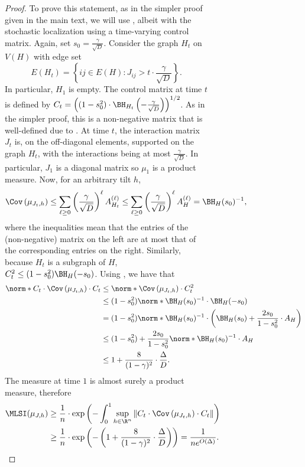 \documentclass[11pt,letterpaper]{article}
\begin{document}
\begin{figure}
\begin{figure}
\begin{proof}
    To prove this statement, as in the simpler proof given in the main text, we will use , albeit with the stochastic localization using a time-varying control matrix. Again, set $s_0 = \frac{\gamma}{\sqrt{D}}$. Consider the graph $H_t$ on $V(H)$ with edge set
    \[ E(H_t) = \left\{ ij \in E(H) : J_{ij} > t \cdot  \frac{\gamma}{\sqrt{D}} \right\}. \]
    In particular, $H_1$ is empty.
    The control matrix at time $t$ is defined by $C_t = \left((1-s_0^2) \cdot \BH_{H_t} \left( - \frac{\gamma}{\sqrt{D}} \right)\right)^{1/2}$. As in the simpler proof, this is a non-negative matrix that is well-defined due to . At time $t$, the interaction matrix $J_t$ is, on the off-diagonal elements, supported on the graph $H_t$, with the interactions being at most $\frac{\gamma}{\sqrt{D}}$. In particular, $J_1$ is a diagonal matrix so $\mu_{1}$ is a product measure. Now, for an arbitrary tilt $h$,
    \[ \Cov\left( \mu_{J_t,h} \right) \le \sum_{\ell \ge 0} \left( \frac{\gamma}{\sqrt{D}} \right)^{\ell} A^{(\ell)}_{H_t} \le \sum_{\ell \ge 0} \left( \frac{\gamma}{\sqrt{D}} \right)^{\ell} A^{(\ell)}_{H} = \BH_{H}(s_0)^{-1}, \]
    where the inequalities mean that the entries of the (non-negative) matrix on the left are at most that of the corresponding entries on the right. Similarly, because $H_t$ is a subgraph of $H$, $C_t^2 \le (1-s_0^2) \BH_H(-s_0)$. Using , we have that
    \begin{align*}
        \norm*{ C_t \cdot \Cov\left( \mu_{J_t,h} \right) \cdot C_t } &\le \norm*{ \Cov\left( \mu_{J_t,h} \right) \cdot C_t^2 } \\
            &\le (1-s_0^2) \norm*{ \BH_{H}(s_0)^{-1} \cdot \BH_{H}(-s_0) } \\
            &= (1-s_0^2) \norm*{ \BH_{H}(s_0)^{-1} \cdot \left(\BH_{H}(s_0) + \frac{2s_0}{1-s_0^2} \cdot A_{H} \right) } \\
            &\le (1-s_0^2) + \frac{2s_0}{1-s_0^2} \norm*{ \BH_{H}(s_0)^{-1} \cdot A_{H} } \\
            &\le 1 + \frac{8}{(1-\gamma)^2} \cdot \frac{\Delta}{D}.
    \end{align*}
    The measure at time $1$ is almost surely a product measure, therefore
    \begin{align*}
        \MLSI(\mu_{J,h}) &\ge \frac{1}{n} \cdot \exp \left( - \int_0^1 \sup_{h \in \R^n} \left\| C_t \cdot \Cov\left( \mu_{J_t,h} \right) \cdot C_t \right\| \right) \\
            &\ge \frac{1}{n} \cdot \exp\left( - \left( 1 + \frac{8}{(1-\gamma)^2} \cdot \frac{\Delta}{D} \right) \right) = \frac{1}{ne^{O(\Delta)}}. \qedhere
    \end{align*}
\end{proof}



\end{figure}
\end{figure}
\end{document}

